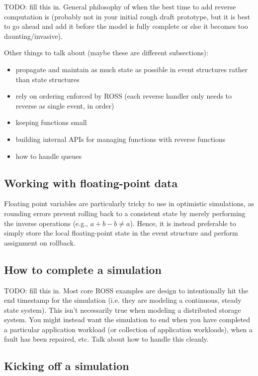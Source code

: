 \documentclass[conference,10pt,compsocconf,onecolumn]{IEEEtran}
\begin{document}
TODO: fill this in.  General philosophy of when the best time to add reverse
computation is (probably not in your initial rough draft prototype, but it
is best to go ahead and add it before the model is fully complete or else it
becomes too daunting/invasive).

Other things to talk about (maybe these are different subsections):
\begin{itemize}
\item propagate and maintain as much state as possible in event structures
rather than state structures
\item rely on ordering enforced by ROSS (each
reverse handler only needs to reverse as single event, in order)
\item keeping functions small 
\item building internal APIs for managing functions with reverse functions
\item how to handle queues
\end{itemize}

\subsection{Working with floating-point data}

Floating point variables are particularly tricky to use in optimistic
simulations, as rounding errors prevent rolling back to a consistent state by
merely performing the inverse operations (e.g., $a+b-b \neq a$). Hence, it is
instead preferable to simply store the local floating-point state in the event
structure and perform assignment on rollback.

\subsection{How to complete a simulation}

TODO: fill this in.  Most core ROSS examples are design to intentionally hit
the end timestamp for the simulation (i.e. they are modeling a continuous,
steady state system).  This isn't necessarily true when modeling a
distributed storage system.  You might instead want the simulation to end
when you have completed a particular application workload (or collection of
application workloads), when a fault has been repaired, etc.  Talk about how
to handle this cleanly.

\subsection{Kicking off a simulation}
\label{sec_kickoff}
\end{document}
